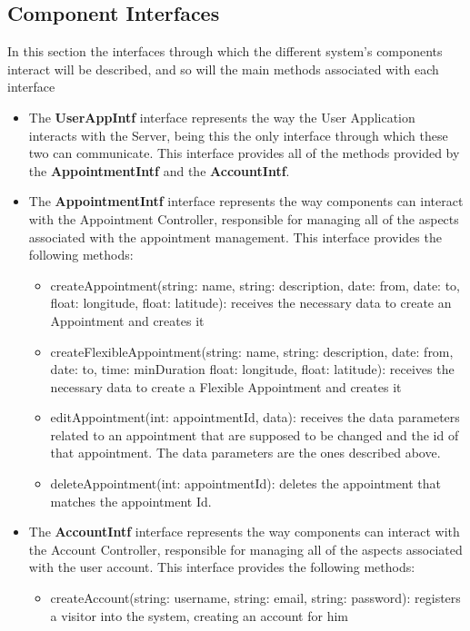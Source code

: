 \documentclass[12pt]{article}
\begin{document}
\subsection{Component Interfaces}
In this section the interfaces through which the different system's components interact will be described, and so will the main methods associated with each interface
\begin{itemize}
    \item The \textbf{UserAppIntf} interface represents the way the User Application interacts with the Server, being this the only interface through which these two can communicate. This interface provides all of the methods provided by the \textbf{AppointmentIntf} and the \textbf{AccountIntf}.
    \item The \textbf{AppointmentIntf} interface represents the way components can interact with the Appointment Controller, responsible for managing all of the aspects associated with the appointment management. This interface provides the following methods:
    \begin{itemize}
        \item createAppointment(string: name, string: description, date: from, date: to, float: longitude, float: latitude): receives the necessary data to create an Appointment and creates it
        \item createFlexibleAppointment(string: name, string: description, date: from, date: to, time: minDuration float: longitude, float: latitude): receives the necessary data to create a Flexible Appointment and creates it
        \item editAppointment(int: appointmentId, data): receives the data parameters related to an appointment that are supposed to be changed and the id of that appointment. The data parameters are the ones described above.
        \item deleteAppointment(int: appointmentId): deletes the appointment that matches the appointment Id.
    \end{itemize}
    \item The \textbf{AccountIntf} interface represents the way components can interact with the Account Controller, responsible for managing all of the aspects associated with the user account. This interface provides the following methods:
    \begin{itemize}
        \item createAccount(string: username, string: email, string: password): registers a visitor into the system, creating an account for him

\end{itemize}
\end{itemize}
\end{document}
